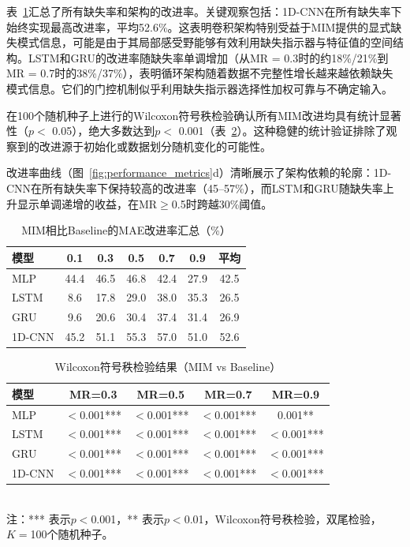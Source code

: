 \documentclass[10pt,a4paper]{ctexart}
\begin{document}
表~\ref{tab:improvement_summary}汇总了所有缺失率和架构的改进率。关键观察包括：1D-CNN在所有缺失率下始终实现最高改进率，平均52.6\%。这表明卷积架构特别受益于MIM提供的显式缺失模式信息，可能是由于其局部感受野能够有效利用缺失指示器与特征值的空间结构。LSTM和GRU的改进率随缺失率单调增加（从MR = 0.3时的约18\%/21\%到MR = 0.7时的38\%/37\%），表明循环架构随着数据不完整性增长越来越依赖缺失模式信息。它们的门控机制似乎利用缺失指示器选择性加权可靠与不确定输入。

在100个随机种子上进行的Wilcoxon符号秩检验确认所有MIM改进均具有统计显著性（$p <$ 0.05），绝大多数达到$p <$ 0.001（表~\ref{tab:significance}）。这种稳健的统计验证排除了观察到的改进源于初始化或数据划分随机变化的可能性。

改进率曲线（图~\ref{fig:performance_metrics}d）清晰展示了架构依赖的轮廓：1D-CNN在所有缺失率下保持较高的改进率（45--57\%），而LSTM和GRU随缺失率上升显示单调递增的收益，在MR$\geq$0.5时跨越30\%阈值。

\begin{table}[!htbp]
\centering
\small
\caption{MIM相比Baseline的MAE改进率汇总（\%）}
\label{tab:improvement_summary}
\begin{tabular}{@{}lcccccc@{}}
\toprule
\textbf{模型} & \textbf{0.1} & \textbf{0.3} & \textbf{0.5} & \textbf{0.7} & \textbf{0.9} & \textbf{平均} \\
\midrule
MLP & 44.4 & 46.5 & 46.8 & 42.4 & 27.9 & 42.5 \\
LSTM & 8.6 & 17.8 & 29.0 & 38.0 & 35.3 & 26.5 \\
GRU & 9.6 & 20.6 & 30.4 & 37.4 & 31.4 & 26.9 \\
1D-CNN & 45.2 & 51.1 & 55.3 & 57.0 & 51.0 & 52.6 \\
\bottomrule
\end{tabular}
\end{table}

\begin{table}[!htbp]
\centering
\small
\caption{Wilcoxon符号秩检验结果（MIM vs Baseline）}
\label{tab:significance}
\begin{tabular}{@{}lcccc@{}}
\toprule
\textbf{模型} & \textbf{MR=0.3} & \textbf{MR=0.5} & \textbf{MR=0.7} & \textbf{MR=0.9} \\
\midrule
MLP & $<$0.001*** & $<$0.001*** & $<$0.001*** & 0.001** \\
LSTM & $<$0.001*** & $<$0.001*** & $<$0.001*** & $<$0.001*** \\
GRU & $<$0.001*** & $<$0.001*** & $<$0.001*** & $<$0.001*** \\
1D-CNN & $<$0.001*** & $<$0.001*** & $<$0.001*** & $<$0.001*** \\
\bottomrule
\end{tabular}
\\[3pt]
\footnotesize 注：*** 表示$p<$0.001，** 表示$p<$0.01，Wilcoxon符号秩检验，双尾检验，$K=$100个随机种子。
\end{table}
\end{document}
